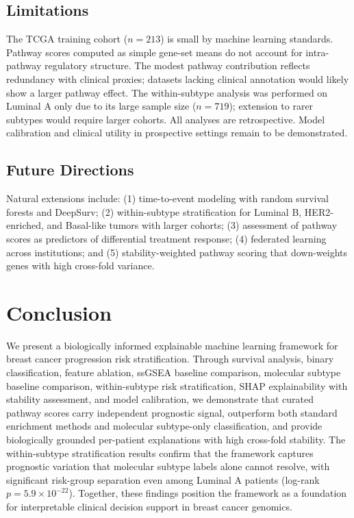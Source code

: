 \documentclass[journal]{IEEEtran}
\begin{document}
\subsection{Limitations}

The TCGA training cohort ($n = 213$) is small by machine learning standards. Pathway scores computed as simple gene-set means do not account for intra-pathway regulatory structure. The modest pathway contribution reflects redundancy with clinical proxies; datasets lacking clinical annotation would likely show a larger pathway effect. The within-subtype analysis was performed on Luminal A only due to its large sample size ($n = 719$); extension to rarer subtypes would require larger cohorts. All analyses are retrospective. Model calibration and clinical utility in prospective settings remain to be demonstrated.

\subsection{Future Directions}

Natural extensions include: (1) time-to-event modeling with random survival forests and DeepSurv; (2) within-subtype stratification for Luminal B, HER2-enriched, and Basal-like tumors with larger cohorts; (3) assessment of pathway scores as predictors of differential treatment response; (4) federated learning across institutions; and (5) stability-weighted pathway scoring that down-weights genes with high cross-fold variance.


\section{Conclusion}
\label{sec:conclusion}

We present a biologically informed explainable machine learning framework for breast cancer progression risk stratification. Through survival analysis, binary classification, feature ablation, ssGSEA baseline comparison, molecular subtype baseline comparison, within-subtype risk stratification, SHAP explainability with stability assessment, and model calibration, we demonstrate that curated pathway scores carry independent prognostic signal, outperform both standard enrichment methods and molecular subtype-only classification, and provide biologically grounded per-patient explanations with high cross-fold stability. The within-subtype stratification results confirm that the framework captures prognostic variation that molecular subtype labels alone cannot resolve, with significant risk-group separation even among Luminal A patients (log-rank $p = 5.9 \times 10^{-22}$). Together, these findings position the framework as a foundation for interpretable clinical decision support in breast cancer genomics.
\end{document}
